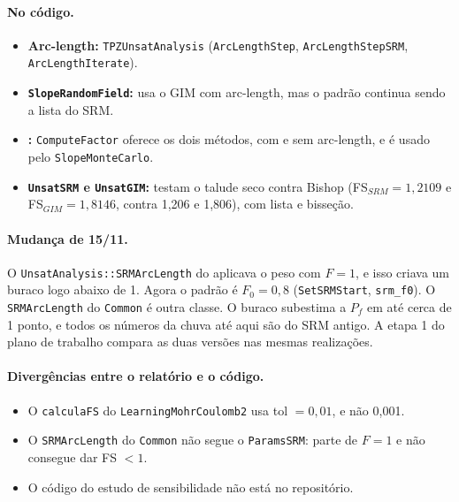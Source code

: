 \paragraph{No código.}
\begin{itemize}
  \item \textbf{Arc-length:} \texttt{TPZUnsatAnalysis} (\texttt{ArcLengthStep}, \texttt{ArcLengthStepSRM},
    \texttt{ArcLengthIterate}).
  \item \textbf{\texttt{SlopeRandomField}:}  usa o GIM com arc-length, mas o padrão continua
    sendo a lista do SRM.
  \item \textbf{:} \texttt{ComputeFactor} oferece os dois métodos, com e sem
    arc-length, e é usado pelo \texttt{SlopeMonteCarlo}.
  \item \textbf{\texttt{UnsatSRM} e \texttt{UnsatGIM}:} testam o talude seco contra Bishop (FS$_{SRM} = 1{,}2109$ e
    FS$_{GIM} = 1{,}8146$, contra 1,206 e 1,806), com lista e bisseção.
\end{itemize}

\paragraph{Mudança de 15/11.} O \texttt{UnsatAnalysis::SRMArcLength} do  aplicava o
peso com $F = 1$, e isso criava um buraco logo abaixo de 1. Agora o padrão é $F_0 = 0{,}8$ (\texttt{SetSRMStart},
\texttt{srm\_f0}). O \texttt{SRMArcLength} do \texttt{Common} é outra classe. O buraco subestima a $P_f$ em até cerca de 1 ponto, e
todos os números da chuva até aqui são do SRM antigo. A etapa 1 do plano de trabalho compara as duas versões nas
mesmas realizações.

\paragraph{Divergências entre o relatório e o código.}
\begin{itemize}
  \item O \texttt{calculaFS} do \texttt{LearningMohrCoulomb2} usa tol $= 0{,}01$, e não 0,001.
  \item O \texttt{SRMArcLength} do \texttt{Common} não segue o \texttt{ParamsSRM}: parte de $F = 1$ e não consegue dar
    FS $< 1$.
  \item O código do estudo de sensibilidade não está no repositório.
\end{itemize}
